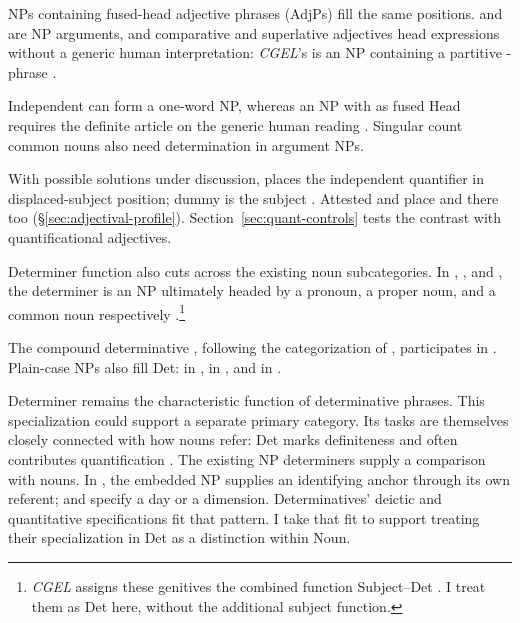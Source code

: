 \documentclass[12pt]{article}
\begin{document}
NPs containing fused-head adjective phrases (AdjPs) fill the same positions.  and  are NP arguments, and comparative and superlative adjectives head expressions without a generic human interpretation: \textit{CGEL}'s  is an NP containing a partitive -phrase \citep[332--333, 416--423]{huddleston2002}.

Independent  can form a one-word NP, whereas an NP with  as fused Head requires the definite article  on the generic human reading \citep[417--418]{huddleston2002}. Singular count common nouns also need determination in argument NPs.

With possible solutions under discussion,  places the independent quantifier in displaced-subject position; dummy  is the subject \citep[1391--1393]{huddleston2002}. Attested  and  place  and  there too (§\ref{sec:adjectival-profile}). Section~\ref{sec:quant-controls} tests the contrast with quantificational adjectives.

Determiner function also cuts across the existing noun subcategories. In , , and , the determiner is an NP ultimately headed by a pronoun, a proper noun, and a common noun respectively \citep[354--355, 470--471]{huddleston2002}.\footnote{\textit{CGEL} assigns these genitives the combined function Subject--Det \citep[472--473]{huddleston2002}. I treat them as Det here, without the additional subject function.}

The compound determinative , following the categorization of \textcite[§1.3]{Payne2007}, participates in . Plain-case NPs also fill Det:  in ,  in , and  in  \citep[355, 357]{huddleston2002}.

Determiner remains the characteristic function of determinative phrases. This specialization could support a separate primary category. Its tasks are themselves closely connected with how nouns refer: Det marks definiteness and often contributes quantification \citep[354--359]{huddleston2002}. The existing NP determiners supply a comparison with nouns. In , the embedded NP supplies an identifying anchor through its own referent;  and  specify a day or a dimension. Determinatives' deictic and quantitative specifications fit that pattern. I take that fit to support treating their specialization in Det as a distinction within Noun.
\end{document}
